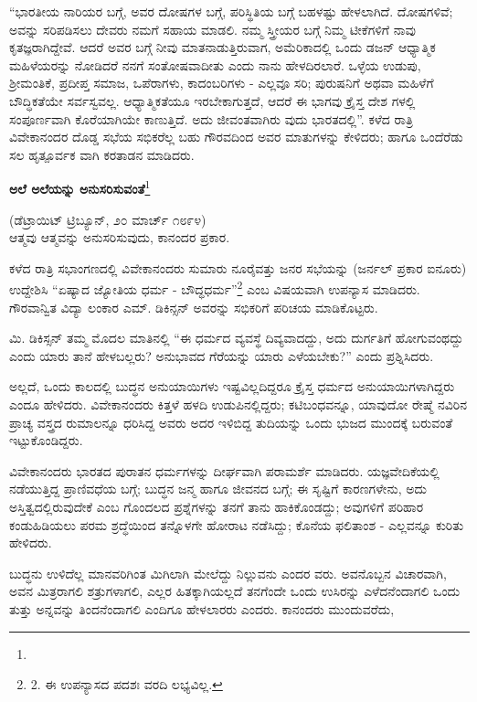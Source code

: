 “ಭಾರತೀಯ ನಾರಿಯರ ಬಗ್ಗೆ, ಅವರ ದೋಷಗಳ ಬಗ್ಗೆ, ಪರಿಸ್ಥಿತಿಯ ಬಗ್ಗೆ ಬಹಳಷ್ಟು ಹೇಳಲಾಗಿದೆ. ದೋಷಗಳಿವೆ; ಅವನ್ನು ಸರಿಪಡಿಸಲು ದೇವರು ನಮಗೆ ಸಹಾಯ ಮಾಡಲಿ. ನಮ್ಮ ಸ್ತ್ರೀಯರ ಬಗ್ಗೆ ನಿಮ್ಮ ಟೀಕೆಗಳಿಗೆ ನಾವು ಕೃತಜ್ಞರಾಗಿದ್ದೇವೆ. ಆದರೆ ಅವರ ಬಗ್ಗೆ ನೀವು ಮಾತನಾಡುತ್ತಿರುವಾಗ, ಅಮೆರಿಕಾದಲ್ಲಿ ಒಂದು ಡಜನ್ ಆಧ್ಯಾತ್ಮಿಕ ಮಹಿಳೆಯರನ್ನು ನೋಡಿದರೆ ನನಗೆ ಸಂತೋಷವಾದೀತು ಎಂದು ನಾನು ಹೇಳದಿರಲಾರೆ. ಒಳ್ಳೆಯ ಉಡುಪು, ಶ‍್ರೀಮಂತಿಕೆ, ಪ್ರದೀಪ್ತ ಸಮಾಜ, ಒಪೆರಾಗಳು, ಕಾದಂಬರಿಗಳು - ಎಲ್ಲವೂ ಸರಿ; ಪುರುಷನಿಗೆ ಅಥವಾ ಮಹಿಳೆಗೆ ಬೌದ್ಧಿಕತೆಯೇ ಸರ್ವಸ್ವವಲ್ಲ. ಆಧ್ಯಾತ್ಮಿಕತೆಯೂ ಇರಬೇಕಾಗುತ್ತದೆ, ಆದರೆ ಈ ಭಾಗವು ಕ್ರೈಸ್ತ ದೇಶ ಗಳಲ್ಲಿ ಸಂಪೂರ್ಣವಾಗಿ ಕೊರೆಯಾಗಿಯೇ ಕಾಣುತ್ತಿದೆ. ಅದು ಜೀವಂತವಾಗಿರು ವುದು ಭಾರತದಲ್ಲಿ”. ಕಳೆದ ರಾತ್ರಿ ವಿವೇಕಾನಂದರ ದೊಡ್ಡ ಸಭೆಯ ಸಭಿಕರೆಲ್ಲ ಬಹು ಗೌರವದಿಂದ ಅವರ ಮಾತುಗಳನ್ನು ಕೇಳಿದರು; ಹಾಗೂ ಒಂದೆರೆಡು ಸಲ ಹೃತ್ಪೂರ್ವಕ ವಾಗಿ ಕರತಾಡನ ಮಾಡಿದರು.

\begin{center}
\textbf{ಅಲೆ ಅಲೆಯನ್ನು ಅನುಸರಿಸುವಂತೆ}\footnote{}
\end{center}

\begin{center}
(ಡೆಟ್ರಾಯಿಟ್ ಟ್ರಿಬ್ಯೂನ್, ೨೦ ಮಾರ್ಚ್ ೧೮೯೪)\\ಆತ್ಮವು ಆತ್ಮವನ್ನು ಅನುಸರಿಸುವುದು, ಕಾನಂದರ ಪ್ರಕಾರ.
\end{center}

ಕಳೆದ ರಾತ್ರಿ ಸಭಾಂಗಣದಲ್ಲಿ ವಿವೇಕಾನಂದರು ಸುಮಾರು ನೂರೈವತ್ತು ಜನರ ಸಭೆಯನ್ನು (ಜರ್ನಲ್ ಪ್ರಕಾರ ಐನೂರು) ಉದ್ದೇಶಿಸಿ “ಏಷ್ಯಾದ ಜ್ಯೋತಿಯ ಧರ್ಮ - ಬೌದ್ಧಧರ್ಮ”\footnote{2. ಈ ಉಪನ್ಯಾಸದ ಪದಶಃ ವರದಿ ಲಭ್ಯವಿಲ್ಲ.} ಎಂಬ ವಿಷಯವಾಗಿ ಉಪನ್ಯಾಸ ಮಾಡಿದರು. ಗೌರವಾನ್ವಿತ ವಿದ್ಯಾ ಲಂಕಾರ ಎಮ್​. ಡಿಕಿನ್ಸನ್ ಅವರನ್ನು ಸಭಿಕರಿಗೆ ಪರಿಚಯ ಮಾಡಿಕೊಟ್ಟರು.

ಮಿ. ಡಿಕಿಸ್ಸನ್ ತಮ್ಮ ಮೊದಲ ಮಾತಿನಲ್ಲಿ “ಈ ಧರ್ಮದ ವ್ಯವಸ್ಥೆ ದಿವ್ಯವಾದದ್ದು, ಅದು ದುರ್ಗತಿಗೆ ಹೋಗುವಂಥದ್ದು ಎಂದು ಯಾರು ತಾನೆ ಹೇಳಬಲ್ಲರು? ಅನುಭಾವದ ಗೆರೆಯನ್ನು ಯಾರು ಎಳೆಯಬೇಕು?” ಎಂದು ಪ್ರಶ್ನಿಸಿದರು.

ಅಲ್ಲದೆ, ಒಂದು ಕಾಲದಲ್ಲಿ ಬುದ್ಧನ ಅನುಯಾಯಿಗಳು ಇಷ್ಟವಿಲ್ಲದಿದ್ದರೂ ಕ್ರೈಸ್ತ ಧರ್ಮದ ಅನುಯಾಯಿಗಳಾಗಿದ್ದರು ಎಂದೂ ಹೇಳಿದರು. ವಿವೇಕಾನಂದರು ಕಿತ್ತಳೆ ಹಳದಿ ಉಡುಪಿನಲ್ಲಿದ್ದರು; ಕಟಿಬಂಧವನ್ನೂ, ಯಾವುದೋ ರೇಷ್ಮೆ ನವಿರಿನ ಪ್ರಾಚ್ಯ ವಸ್ತ್ರದ ರುಮಾಲನ್ನೂ ಧರಿಸಿದ್ದ ಅವರು ಅದರ ಇಳಿಬಿದ್ದ ತುದಿಯನ್ನು ಒಂದು ಭುಜದ ಮುಂದಕ್ಕೆ ಬರುವಂತೆ ಇಟ್ಟುಕೊಂಡಿದ್ದರು.

ವಿವೇಕಾನಂದರು ಭಾರತದ ಪುರಾತನ ಧರ್ಮಗಳನ್ನು ದೀರ್ಘವಾಗಿ ಪರಾಮರ್ಶೆ ಮಾಡಿದರು. ಯಜ್ಞವೇದಿಕೆಯಲ್ಲಿ ನಡೆಯುತ್ತಿದ್ದ ಪ್ರಾಣಿವಧೆಯ ಬಗ್ಗೆ; ಬುದ್ಧನ ಜನ್ಮ ಹಾಗೂ ಜೀವನದ ಬಗ್ಗೆ; ಈ ಸೃಷ್ಟಿಗೆ ಕಾರಣಗಳೇನು, ಅದು ಅಸ್ತಿತ್ವದಲ್ಲಿರುವುದೇಕೆ ಎಂಬ ಗೊಂದಲದ ಪ್ರಶ್ನೆಗಳನ್ನು ತನಗೆ ತಾನು ಹಾಕಿಕೊಂಡದ್ದು; ಅವುಗಳಿಗೆ ಪರಿಹಾರ ಕಂಡುಹಿಡಿಯಲು ಪರಮ ಶ್ರದ್ಧೆಯಿಂದ ತನ್ನೊಳಗೇ ಹೋರಾಟ ನಡೆಸಿದ್ದು; ಕೊನೆಯ ಫಲಿತಾಂಶ - ಎಲ್ಲವನ್ನೂ ಕುರಿತು ಹೇಳಿದರು.

ಬುದ್ಧನು ಉಳಿದೆಲ್ಲ ಮಾನವರಿಗಿಂತ ಮಿಗಿಲಾಗಿ ಮೇಲೆದ್ದು ನಿಲ್ಲುವನು ಎಂದರ ವರು. ಅವನೊಬ್ಬನ ವಿಚಾರವಾಗಿ, ಅವನ ಮಿತ್ರರಾಗಲಿ ಶತ್ರುಗಳಾಗಲಿ, ಎಲ್ಲರ ಹಿತಕ್ಕಾಗಿಯಲ್ಲದೆ ತನಗೆಂದೇ ಒಂದು ಉಸಿರನ್ನು ಎಳೆದನೆಂದಾಗಲಿ ಒಂದು ತುತ್ತು ಅನ್ನವನ್ನು ತಿಂದನೆಂದಾಗಲಿ ಎಂದಿಗೂ ಹೇಳಲಾರರು ಎಂದರು. ಕಾನಂದರು ಮುಂದುವರೆದು,

